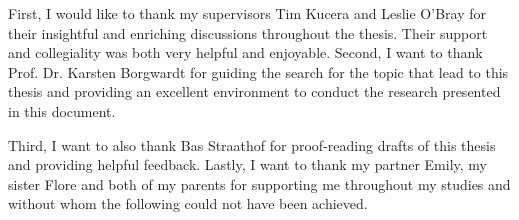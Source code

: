 First, I would like to thank my supervisors Tim Kucera and Leslie O'Bray for
their insightful and enriching discussions throughout the thesis. Their support
and collegiality was both very helpful and enjoyable. Second, I want to thank
Prof. Dr. Karsten Borgwardt for guiding the search for the topic that lead to
this thesis and providing an excellent environment to conduct the research
presented in this document.

Third, I want to also thank Bas Straathof for proof-reading drafts of this
thesis and providing helpful feedback. Lastly, I want to thank my partner Emily,
my sister Flore and both of my parents for supporting me throughout my studies and
without whom the following could not have been achieved.
